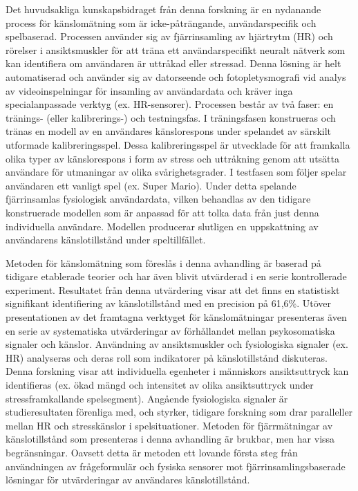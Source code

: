 Det huvudsakliga kunskapsbidraget fr{\aa}n denna forskning {\"a}r en nydanande process f{\"o}r k{\"a}nslom{\"a}tning som {\"a}r icke-p{\aa}tr{\"a}ngande, anv{\"a}ndarspecifik och spelbaserad. Processen anv{\"a}nder sig av fj{\"a}rrinsamling av hj{\"a}rtrytm (HR) och r{\"o}relser i ansiktsmuskler f{\"o}r att tr{\"a}na ett anv{\"a}ndarspecifikt neuralt n{\"a}tverk som kan identifiera om anv{\"a}ndaren {\"a}r uttr{\aa}kad eller stressad. Denna l{\"o}sning {\"a}r helt automatiserad och anv{\"a}nder sig av datorseende och fotopletysmografi vid analys av videoinspelningar f{\"o}r insamling av anv{\"a}ndardata och kr{\"a}ver inga specialanpassade verktyg (ex. HR-sensorer). Processen best{\aa}r av tv{\aa} faser: en tr{\"a}nings- (eller kalibrerings-) och testningsfas. I tr{\"a}ningsfasen konstrueras och tr{\"a}nas en modell av en anv{\"a}ndares k{\"a}nslorespons under spelandet av s{\"a}rskilt utformade kalibreringsspel. Dessa kalibreringsspel {\"a}r utvecklade f{\"o}r att framkalla olika typer av k{\"a}nslorespons i form av stress och uttr{\aa}kning genom att uts{\"a}tta anv{\"a}ndare f{\"o}r utmaningar av olika sv{\aa}righetsgrader. I testfasen som f{\"o}ljer spelar anv{\"a}ndaren ett vanligt spel (ex. Super Mario). Under detta spelande fj{\"a}rrinsamlas fysiologisk anv{\"a}ndardata, vilken behandlas av den tidigare konstruerade modellen som {\"a}r anpassad f{\"o}r att tolka data fr{\aa}n just denna individuella anv{\"a}ndare. Modellen producerar slutligen en uppskattning av anv{\"a}ndarens k{\"a}nslotillst{\aa}nd under speltillf{\"a}llet.

Metoden f{\"o}r k{\"a}nslom{\"a}tning som f{\"o}resl{\aa}s i denna avhandling {\"a}r baserad p{\aa} tidigare etablerade teorier och har {\"a}ven blivit utv{\"a}rderad i en serie kontrollerade experiment. Resultatet fr{\aa}n denna utv{\"a}rdering visar att det finns en statistiskt signifikant identifiering av k{\"a}nslotillst{\aa}nd med en precision p{\aa} 61,6\%. Ut{\"o}ver presentationen av det framtagna verktyget f{\"o}r k{\"a}nslom{\"a}tningar presenteras {\"a}ven en serie av systematiska utv{\"a}rderingar av f{\"o}rh{\aa}llandet mellan psykosomatiska signaler och k{\"a}nslor. Anv{\"a}ndning av ansiktsmuskler och fysiologiska signaler (ex. HR) analyseras och deras roll som indikatorer p{\aa} k{\"a}nslotillst{\aa}nd diskuteras. Denna forskning visar att individuella egenheter i m{\"a}nniskors ansiktsuttryck kan identifieras (ex. {\"o}kad m{\"a}ngd och intensitet av olika ansiktsuttryck under stressframkallande spelsegment). Ang{\aa}ende fysiologiska signaler {\"a}r studieresultaten f{\"o}renliga med, och styrker, tidigare forskning som drar paralleller mellan HR och stressk{\"a}nslor i spelsituationer. Metoden f{\"o}r fj{\"a}rrm{\"a}tningar av k{\"a}nslotillst{\aa}nd som presenteras i denna avhandling {\"a}r brukbar, men har vissa begr{\"a}nsningar. Oavsett detta {\"a}r metoden ett lovande f{\"o}rsta steg fr{\aa}n anv{\"a}ndningen av fr{\aa}geformul{\"a}r och fysiska sensorer mot fj{\"a}rrinsamlingsbaserade l{\"o}sningar f{\"o}r utv{\"a}rderingar av anv{\"a}ndares k{\"a}nslotillst{\aa}nd.
